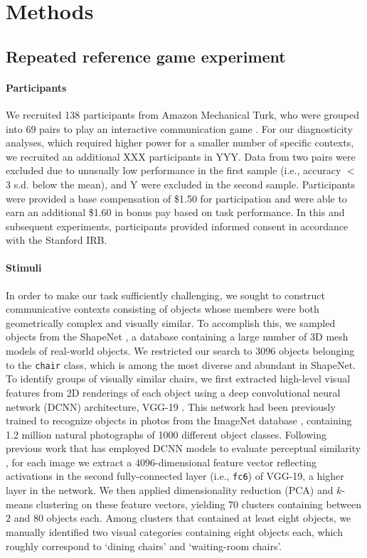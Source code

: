 \documentclass[11pt,letterpaper]{article}
\begin{document}
\section{Methods}

\subsection{Repeated reference game experiment}

\paragraph{Participants} We recruited 138 participants from Amazon Mechanical Turk, who were grouped into 69 pairs to play an interactive communication game \cite{Hawkins15_RealTimeWebExperiments}.
For our diagnosticity analyses, which required higher power for a smaller number of specific contexts, we recruited an additional XXX participants in YYY.
Data from two pairs were excluded due to unusually low performance in the first sample (i.e., accuracy $<$ 3 s.d. below the mean), and Y were excluded in the second sample.
Participants were provided a base compensation of \$1.50 for participation and were able to earn an additional \$1.60 in bonus pay based on task performance.
In this and subsequent experiments, participants provided informed consent in accordance with the Stanford IRB.

\paragraph{Stimuli}

In order to make our task sufficiently challenging, we sought to construct communicative contexts consisting of objects whose members were both geometrically complex and visually similar.
To accomplish this, we sampled objects from the ShapeNet \cite{chang2015shapenet}, a database containing a large number of 3D mesh models of real-world objects. %
We restricted our search to 3096 objects belonging to the \texttt{chair} class, which is among the most diverse and abundant in ShapeNet.
To identify groups of visually similar chairs, we first extracted high-level visual features from 2D renderings of each object using a deep convolutional neural network (DCNN) architecture, VGG-19 \cite{simonyan2014very}.
This network had been previously trained to recognize objects in photos from the ImageNet database \cite{deng2009imagenet}, containing 1.2 million natural photographs of 1000 different object classes.
Following previous work that has employed DCNN models to evaluate perceptual similarity \cite{peterson2018evaluating,kubilius2016deep}, for each image we extract a 4096-dimensional feature vector reflecting activations in the second fully-connected layer (i.e., \texttt{fc6}) of VGG-19, a higher layer in the network.
We then applied dimensionality reduction (PCA) and $k$-means clustering on these feature vectors, yielding 70 clusters containing between 2 and 80 objects each.
Among clusters that contained at least eight objects, we manually identified two visual categories containing eight objects each, which roughly correspond to `dining chairs' and `waiting-room chairs'.
\end{document}
